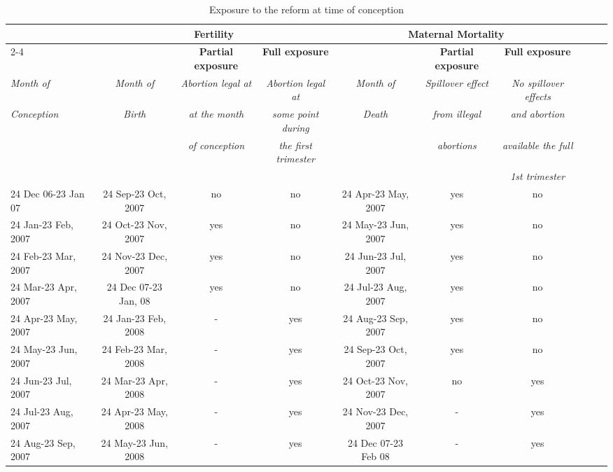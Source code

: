 \documentclass[a4paper, 11pt]{article}
\begin{document}
\begin{spacing}{1.4}
\begin{table}
  \caption{Exposure to the reform at time of conception}\label{Exposure}
  \centering
  \begin{threeparttable}  {\small \begin{tabular}{lccccccccc}
        \hline\hline   \multirow{1}{*}{} &
        \multicolumn{3}{c}{\textbf{Fertility}} & 	\multicolumn{3}{c}{\textbf{Maternal Mortality}} \\\cline{2-4}\cline{5-7} 
        \multirow{2}{*}{} &&
	\multicolumn{1}{c}{\textbf{Partial exposure}} & 	\multicolumn{1}{c}{\textbf{Full exposure}}&&\multicolumn{1}{c}{\textbf{Partial exposure}} & 	\multicolumn{1}{c}{\textbf{Full exposure}}\\ 
	\textit{Month of}   & \textit{Month of}  & \textit{Abortion legal at}   & \textit{Abortion legal at}  & \textit{Month of}  & \textit{Spillover effect}   & \textit{No spillover effects}\\ 
	\textit{Conception}& \textit{Birth}&\textit{at the month}&\textit{some point during} & \textit{Death}&\textit{from illegal  }&\textit{and abortion}\\
	&  &\textit{of conception}&\textit{the first trimester} & &\textit{abortions}&\textit{available the full}\\
	&  & & &  & &\textit{1st trimester}\\
	\hline 
        24 Dec 06-23 Jan 07	&	24 Sep-23 Oct, 2007	&	no	&	no	&	24 Apr-23 May, 2007	&	yes 	&	no	\\
        24 Jan-23 Feb, 2007	&	24 Oct-23 Nov, 2007	&	yes	&	no	&	24 May-23 Jun, 2007	&	yes 	&	no	\\
        24 Feb-23 Mar, 2007	&	24 Nov-23 Dec, 2007	&	yes	&	no	&	24 Jun-23 Jul, 2007	&	yes 	&	no	\\
        24 Mar-23 Apr, 2007	&	24 Dec 07-23 Jan, 08	&	yes	&	no	&	24 Jul-23 Aug, 2007	&	yes 	&	no	\\
        24 Apr-23 May, 2007	&	24 Jan-23 Feb, 2008	&	-	&	yes	&	24 Aug-23 Sep, 2007	&	yes 	&	no	\\
        24 May-23 Jun, 2007	&	24 Feb-23 Mar, 2008	&	-	&	yes	&	24 Sep-23 Oct, 2007	&	yes 	&	no	\\
        24 Jun-23 Jul, 2007	&	24 Mar-23 Apr, 2008	&	-	&	yes	&	24 Oct-23 Nov, 2007	&	no	&	yes	\\
        24 Jul-23 Aug, 2007	&	24 Apr-23 May, 2008	&	-	&	yes	&	24 Nov-23 Dec, 2007	&	-	&	yes	\\
        24 Aug-23 Sep, 2007	&	24 May-23 Jun, 2008	&	-	&	yes	&	24 Dec 07-23 Feb 08	&	-	&	yes	\\

\end{tabular}}
\end{threeparttable}
\end{table}
\end{spacing}
\end{document}
